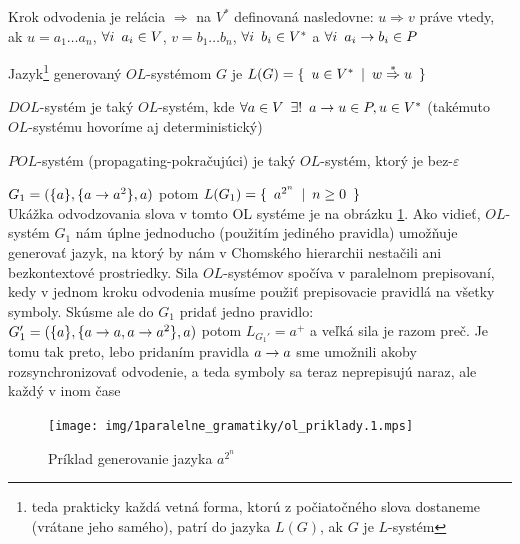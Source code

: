 \begin{definicia}
Krok odvodenia je relácia $\Rightarrow$ na $V^{*}$ definovaná
nasledovne: $u\Rightarrow v$ práve vtedy, ak $u=a_{1}\dots a_{n}$,
$\forall i\enspace a_{i}\in V$, $v=b_{1}\dots b_{n}$, $\forall i\enspace
b_{i}\in V^{*}$ a $\forall i\enspace a_{i}\rightarrow b_{i}\in P$
\end{definicia}

\begin{definicia}
Jazyk\footnote{teda prakticky každá vetná forma, ktorú z
počiatočného slova dostaneme (vrátane jeho samého), patrí do
jazyka $L(G)$, ak $G$ je $L$-systém} generovaný $OL$-systémom $G$
je $L(G)=\{\enspace u\in V^{*}\enspace |\enspace w\overset{*}\Rightarrow u\enspace\}$
\end{definicia}

\begin{definicia}
$DOL$-systém je taký $OL$-systém, kde $\forall a\in V\enspace\exists!
\enspace a\rightarrow u\in P, u\in V^*$ (takémuto \mbox{$OL$-sys\-té\-mu}
hovoríme aj deterministický)
\end{definicia}

\begin{definicia}
$POL$-systém (propagating-pokračujúci) je taký $OL$-systém, ktorý
je bez-$\varepsilon$
\end{definicia}

\begin{priklad}
$G_{1}=(\{ a\},\{ a\rightarrow a^{2}\},a)$ potom $L(G_{1})=\{\enspace
a^{2^{n}}\enspace |\enspace n\geq 0\enspace\}$\\
Ukážka odvodzovania slova v tomto OL systéme je na obrázku 
\ref{img:ol_priklad_1}.
Ako vidieť, $OL$-systém $G_{1}$ nám
úplne jednoducho (použitím jediného pravidla) umožňuje
ge\-ne\-ro\-vať jazyk, na ktorý by nám v Chomského hierarchii
nestačili ani bezkontextové prostriedky. Sila $OL$-systémov
spočíva v paralelnom prepisovaní, kedy v jednom kroku odvodenia
musíme použiť prepisovacie pravidlá na všetky symboly. Skúsme ale
do $G_{1}$ pridať jedno pravidlo:\\ $G_{1}'=(\{ a\},\{ a\rightarrow a,
a\rightarrow a^{2}\},a)$ potom $L_{G_{1}'}=a^{+}$ a veľká sila je razom
preč. Je tomu tak preto, lebo pridaním pravidla $a\rightarrow a$ sme
umožnili akoby rozsynchronizovať odvodenie, a teda symboly sa
teraz neprepisujú naraz, ale každý v inom čase
\end{priklad}

\begin{figure}[htp]
    \centering
    \texttt{[image: img/1paralelne\_gramatiky/ol\_priklady.1.mps]}
    \caption{Príklad generovanie jazyka $a^{2^n}$}
    \label{img:ol_priklad_1}
\end{figure}

